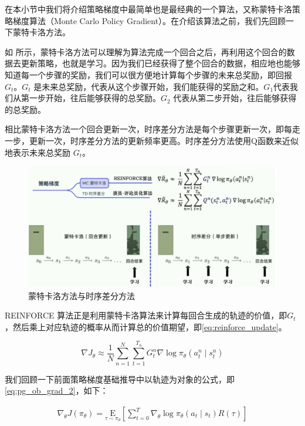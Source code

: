 在本小节中我们将介绍策略梯度中最简单也是最经典的一个算法，又称蒙特卡洛策略梯度算法（Monte Carlo Policy Gradient）。在介绍该算法之前，我们先回顾一下蒙特卡洛方法。

如 所示，蒙特卡洛方法可以理解为算法完成一个回合之后，再利用这个回合的数据去更新策略，也就是学习。因为我们已经获得了整个回合的数据，相应地也能够知道每一个步骤的奖励，我们可以很方便地计算每个步骤的未来总奖励，即回报 $G_t$。$G_t$ 是未来总奖励，代表从这个步骤开始，我们能获得的奖励之和。$G_1 $代表我们从第一步开始，往后能够获得的总奖励。$G_2$ 代表从第二步开始，往后能够获得的总奖励。

相比蒙特卡洛方法一个回合更新一次，时序差分方法是每个步骤更新一次，即每走一步，更新一次，时序差分方法的更新频率更高。时序差分方法使用Q函数来近似地表示未来总奖励 $G_t$。
\begin{figure}[hbt]
    \centering
    \includegraphics[width=0.5\linewidth]{ch6/figs/mc_td.png}
    \caption{蒙特卡洛方法与时序差分方法}
    \label{fig:mc_td}
\end{figure}

REINFORCE 算法正是利用蒙特卡洛算法来计算每回合生成的轨迹的价值，即$G_t$，然后乘上对应轨迹的概率从而计算总的价值期望，即\eqref{eq:reinforce_update}。

\begin{equation}
    \label{eq:reinforce_update}
    \nabla J_{\theta} \approx \frac{1}{N} \sum_{n=1}^{N} \sum_{t=1}^{T_{n}} G_{t}^{n} \nabla \log \pi_{\theta}\left(a_{t}^{n} \mid s_{t}^{n}\right)
\end{equation}

我们回顾一下前面策略梯度基础推导中以轨迹为对象的公式，即\eqref{eq:pg_ob_grad_2}，如下：

\begin{equation}
    \begin{aligned}
    \nabla_\theta J\left(\pi_\theta\right) = \underset{\tau \sim \pi_\theta}{\mathrm{E}}\left[\sum_{t=0}^T \nabla_\theta \log \pi_\theta\left(a_t \mid s_t\right) R(\tau)\right]
    \end{aligned}
\end{equation}

